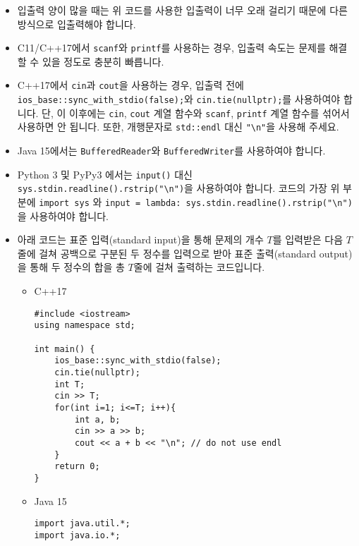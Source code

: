 \begin{itemize}[noitemsep]
\begin{itemize}[noitemsep]
    \end{itemize}

    \item 입출력 양이 많을 때는 위 코드를 사용한 입출력이 너무 오래 걸리기 때문에 다른 방식으로 입출력해야 합니다.

    \item C11/C++17에서 \texttt{scanf}와 \texttt{printf}를 사용하는 경우, 입출력 속도는 문제를 해결할 수 있을 정도로 충분히 빠릅니다.
    \item C++17에서 \texttt{cin}과 \texttt{cout}을 사용하는 경우, 입출력 전에 \texttt{ios\_base::sync\_with\_stdio(false);}와 \texttt{cin.tie(nullptr);}를 사용하여야 합니다. 단, 이 이후에는 \texttt{cin}, \texttt{cout} 계열 함수와 \texttt{scanf}, \texttt{printf} 계열 함수를 섞어서 사용하면 안 됩니다. 또한, 개행문자로 \texttt{std::endl} 대신 \verb$"\n"$을 사용해 주세요. 

    \item Java 15에서는 \texttt{BufferedReader}와 \texttt{BufferedWriter}를 사용하여야 합니다.
    
    \item Python 3 및 PyPy3 에서는 \texttt{input()} 대신 \verb$sys.stdin.readline().rstrip("\n")$을 사용하여야 합니다. 코드의 가장 위 부분에 \texttt{import sys} 와 \verb$input = lambda: sys.stdin.readline().rstrip("\n")$ 을 사용하여야 합니다.
    
    \item 아래 코드는 표준 입력(standard input)을 통해 문제의 개수 $T$를 입력받은 다음 $T$줄에 걸쳐 공백으로 구분된 두 정수를 입력으로 받아 표준 출력(standard output)을 통해 두 정수의 합을 총 $T$줄에 걸쳐 출력하는 코드입니다.

    \begin{itemize}[noitemsep]
        
        \item C++17
        \begin{verbatim}
#include <iostream>
using namespace std;

int main() {
    ios_base::sync_with_stdio(false);
    cin.tie(nullptr);
    int T;
    cin >> T;
    for(int i=1; i<=T; i++){
        int a, b;
        cin >> a >> b;
        cout << a + b << "\n"; // do not use endl
    }
    return 0;
}
        \end{verbatim}
        
        \item Java 15
        \begin{verbatim}
import java.util.*;
import java.io.*;


\end{verbatim}
\end{itemize}
\end{itemize}
